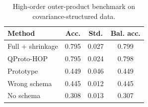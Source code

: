 \begin{table}[t]
\centering
\caption{High-order outer-product benchmark on covariance-structured data.}
\label{tab:hop}
\begin{tabular}{lccc}
\toprule
Method & Acc. & Std. & Bal. acc. \\
\midrule
Full + shrinkage & 0.795 & 0.027 & 0.799 \\
QProto-HOP & 0.795 & 0.024 & 0.798 \\
Prototype & 0.449 & 0.046 & 0.449 \\
Wrong schema & 0.445 & 0.012 & 0.445 \\
No schema & 0.308 & 0.013 & 0.307 \\
\bottomrule
\end{tabular}
\end{table}
